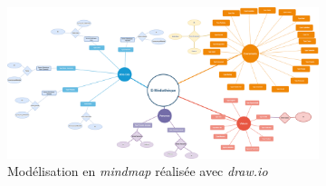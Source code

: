 \begin{figure}[htbp]
	\centering
	\begin{subfigure}{0.45\textwidth}
		\centering
		\includegraphics[width=\linewidth]{img/MODEL_emediatheque_mindmap}
		\caption{Modélisation en \textit{mindmap} réalisée avec \textit{draw.io}}
		\label{model:mindmap-emediatheque}
	\end{subfigure}
	\begin{subfigure}{0.45\textwidth}
		\centering

\end{subfigure}
\end{figure}
